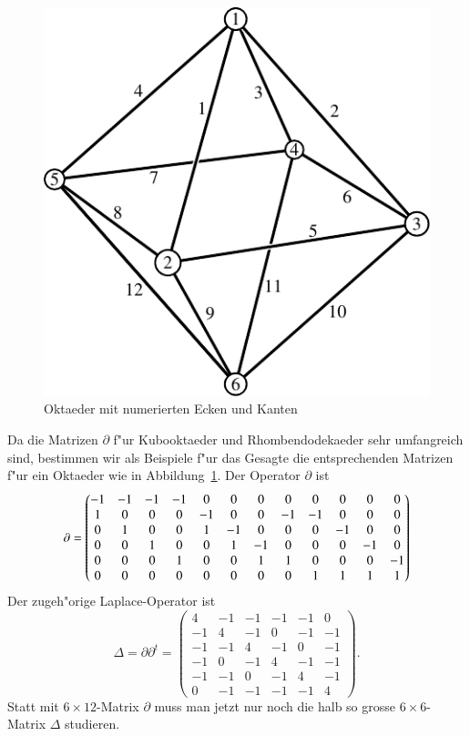 \documentclass[a4paper,12pt]{article}
\begin{document}
\begin{figure}
\centering
\includegraphics{../aufgaben/1/10000028/octahedron-1.pdf}
\caption{Oktaeder mit numerierten Ecken und Kanten
\label{oktaeder-kanten}}
\end{figure}
Da die Matrizen $\partial$ f"ur Kubooktaeder und Rhombendodekaeder
sehr umfangreich sind, bestimmen wir als Beispiele f"ur das Gesagte
die entsprechenden Matrizen f"ur ein Oktaeder wie in
Abbildung~\ref{oktaeder-kanten}.
Der Operator $\partial$ ist
\[
\setcounter{MaxMatrixCols}{20}
\partial=\begin{pmatrix}
-1& -1&-1&-1& 0& 0& 0& 0& 0& 0& 0& 0\\ %
 1&  0& 0& 0&-1& 0& 0&-1&-1& 0& 0& 0\\ %
 0&  1& 0& 0& 1&-1& 0& 0& 0&-1& 0& 0\\ %
 0&  0& 1& 0& 0& 1&-1& 0& 0& 0&-1& 0\\ %
 0&  0& 0& 1& 0& 0& 1& 1& 0& 0& 0&-1\\ %
 0&  0& 0& 0& 0& 0& 0& 0& 1& 1& 1& 1   %
\end{pmatrix}
\]
Der zugeh"orige Laplace-Operator ist
\[
\Delta=\partial\partial^t
=\begin{pmatrix}
   4& -1& -1& -1& -1&  0\\
  -1&  4& -1&  0& -1& -1\\
  -1& -1&  4& -1&  0& -1\\
  -1&  0& -1&  4& -1& -1\\
  -1& -1&  0& -1&  4& -1\\
   0& -1& -1& -1& -1&  4
\end{pmatrix}.
\]
Statt mit $6\times 12$-Matrix  $\partial$ muss man jetzt nur noch
die halb so grosse $6\times 6$-Matrix $\Delta$ studieren.
\end{document}

